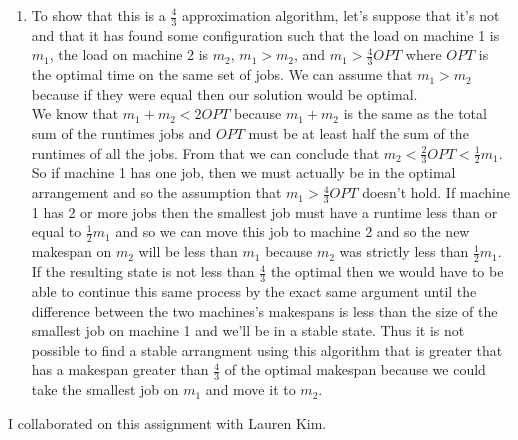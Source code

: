 \documentclass{article}
\begin{document}
\begin{enumerate}
	\item To show that this is a $\frac{4}{3}$ approximation algorithm, let's suppose that it's not and that it has found some configuration such that the load on machine 1 is $m_1$, the load on machine 2 is $m_2$, $m_1 > m_2$, and $m_1 > \frac{4}{3}OPT$ where $OPT$ is the optimal time on the same set of jobs.  We can assume that $m_1 > m_2$ because if they were equal then our solution would be optimal. \\ 
	
	We know that $m_1+m_2 < 2OPT$ because $m_1+m_2$ is the same as the total sum of the runtimes jobs and $OPT$ must be at least half the sum of the runtimes of all the jobs.  From that we can conclude that $m_2 < \frac{2}{3}OPT < \frac{1}{2} m_1$.  \\
	
	So if machine 1 has one job, then we must actually be in the optimal arrangement and so the assumption that $m_1 > \frac{4}{3}OPT$ doesn't hold.  If machine 1 has 2 or more jobs then the smallest job must have a runtime less than or equal to $\frac{1}{2}m_1$ and so we can move this job to machine 2 and so the new makespan on $m_2$ will be less than $m_1$ because $m_2$ was strictly less than $\frac{1}{2}m_1$.  If the resulting state is not less than $\frac{4}{3}$ the optimal then we would have to be able to continue this same process by the exact same argument until the difference between the two machines's makespans is less than the size of the smallest job on machine 1 and we'll be in a stable state.  Thus it is not possible to find a stable arrangment using this algorithm that is greater that has a makespan greater than $\frac{4}{3}$ of the optimal makespan because we could take the smallest job on $m_1$ and move it to $m_2$.  
\end{enumerate}

\newpage
I collaborated on this assignment with Lauren Kim.  
\end{document}
